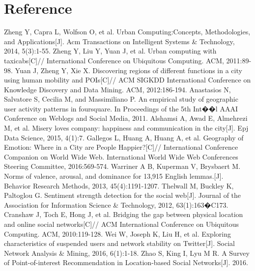 \documentclass{llncs}
\begin{document}
\section{Reference}
\begin{thebibliography}{1}
Zheng Y, Capra L, Wolfson O, et al. Urban Computing:Concepts, Methodologies, and Applications[J]. Acm Transactions on Intelligent Systems \& Technology, 2014, 5(3):1-55.
Zheng Y, Liu Y, Yuan J, et al. Urban computing with taxicabs[C]// International Conference on Ubiquitous Computing. ACM, 2011:89-98.
Yuan J, Zheng Y, Xie X. Discovering regions of different functions in a city using human mobility and POIs[C]// ACM SIGKDD International Conference on Knowledge Discovery and Data Mining. ACM, 2012:186-194.
Anastasios N, Salvatore S, Cecilia M, and Massimiliano P. An empirical study of geographic user activity patterns in foursquare. In Proceedings of the 5th Int��l AAAI Conference on Weblogs and Social Media, 2011.
Alshamsi A, Awad E, Almehrezi M, et al. Misery loves company: happiness and communication in the city[J]. Epj Data Science, 2015, 4(1):7.
Gallegos L, Huang A, Huang A, et al. Geography of Emotion: Where in a City are People Happier?[C]// International Conference Companion on World Wide Web. International World Wide Web Conferences Steering Committee, 2016:569-574.
Warriner A B, Kuperman V, Brysbaert M. Norms of valence, arousal, and dominance for 13,915 English lemmas.[J]. Behavior Research Methods, 2013, 45(4):1191-1207.
Thelwall M, Buckley K, Paltoglou G. Sentiment strength detection for the social web[J]. Journal of the Association for Information Science \& Technology, 2012, 63(1):163�C173.
Cranshaw J, Toch E, Hong J, et al. Bridging the gap between physical location and online social networks[C]// ACM International Conference on Ubiquitous Computing. ACM, 2010:119-128.
Wei W, Joseph K, Liu H, et al. Exploring characteristics of suspended users and network stability on Twitter[J]. Social Network Analysis \& Mining, 2016, 6(1):1-18.
Zhao S, King I, Lyu M R. A Survey of Point-of-interest Recommendation in Location-based Social Networks[J]. 2016.
\iffalse
\bibitem{15}
\bibitem{16}
\bibitem{17}
\bibitem{18}
\bibitem{19}
\bibitem{20}
\bibitem{21}
\bibitem{22}
\bibitem{23}
\bibitem{24}
\bibitem{25}
\fi
\end{thebibliography}
\end{document}
